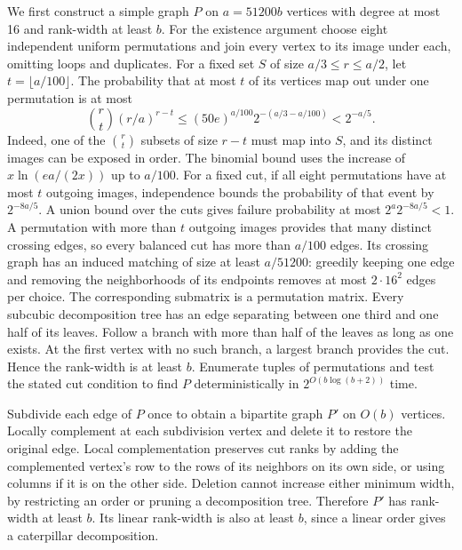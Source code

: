 \documentclass[11pt]{article}
\begin{document}
We first construct a simple graph \(P\) on \(a=51200b\) vertices
with degree at most 16 and rank-width at least \(b\). For the
existence argument choose eight independent uniform permutations
and join every vertex to its image under each, omitting loops and
duplicates. For a fixed set \(S\) of size \(a/3\le r\le a/2\), let
\(t=\lfloor a/100\rfloor\). The probability that at most \(t\) of
its vertices map out under one permutation is at most
\[
 \binom rt(r/a)^{r-t}
 \le (50e)^{a/100}2^{-(a/3-a/100)}<2^{-a/5}.
\]
Indeed, one of the \(\binom rt\) subsets of size \(r-t\) must
map into \(S\), and its distinct images can be exposed in order.
The binomial bound uses the increase of \(x\ln(ea/(2x))\) up to
\(a/100\). For a fixed cut, if all eight permutations have at most
\(t\) outgoing images, independence bounds the probability of that
event by \(2^{-8a/5}\). A union bound over the cuts gives failure
probability at most \(2^a2^{-8a/5}<1\). A permutation with more
than \(t\) outgoing images provides that many distinct crossing
edges, so every balanced cut has more than \(a/100\) edges. Its crossing
graph has an induced matching of size at least \(a/51200\):
greedily keeping one edge and removing the neighborhoods of its
endpoints removes at most \(2\cdot16^2\) edges per choice.
The corresponding submatrix is a permutation matrix.
Every subcubic decomposition tree has an edge separating between
one third and one half of its leaves. Follow a branch with more
than half of the leaves as long as one exists. At the first
vertex with no such branch, a largest branch provides the cut.
Hence the rank-width is at least \(b\).
Enumerate tuples of permutations and test the stated cut condition
to find \(P\) deterministically in \(2^{O(b\log(b+2))}\) time.

Subdivide each edge of \(P\) once to obtain a bipartite graph \(P'\)
on \(O(b)\) vertices. Locally complement at each subdivision
vertex and delete it to restore the original edge. Local
complementation preserves cut ranks by adding the complemented
vertex's row to the rows of its neighbors on its own side, or
using columns if it is on the other side. Deletion cannot increase
either minimum width, by restricting an order or pruning a
decomposition tree. Therefore \(P'\) has rank-width at least \(b\).
Its linear rank-width is also at least \(b\), since a linear order
gives a caterpillar decomposition.
\end{document}
